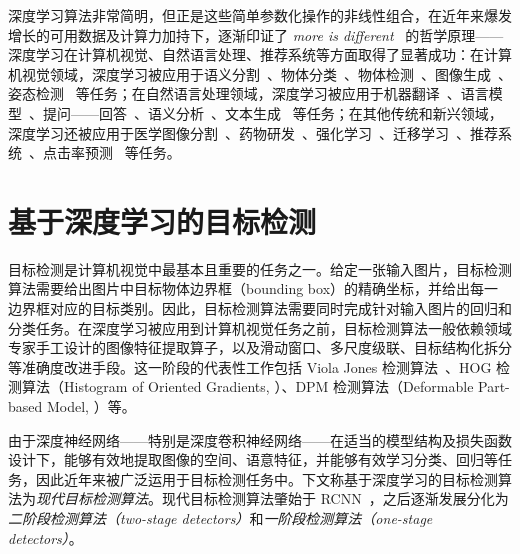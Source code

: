 \documentclass[
  fontset = mac,
]{shtthesis}
\begin{document}
深度学习算法非常简明，但正是这些简单参数化操作的非线性组合，在近年来爆发增长的可用数据及计算力加持下，逐渐印证了 \emph{more is different}~\citep{anderson1972more} 的哲学原理——深度学习在计算机视觉、自然语言处理、推荐系统等方面取得了显著成功：在计算机视觉领域，深度学习被应用于语义分割~\citep{yuan2019object}、物体分类~\citep{xie2019self}、物体检测~\citep{liu2019cbnet}、图像生成~\citep{song2019generative}、姿态检测~\citep{bulat2020toward} 等任务；在自然语言处理领域，深度学习被应用于机器翻译~\citep{edunov2018understanding}、语言模型~\citep{shoeybi2019megatron}、提问——回答~\citep{zhang2020retrospective}、语义分析~\citep{raffel2019exploring}、文本生成~\citep{guo2018long} 等任务；在其他传统和新兴领域，深度学习还被应用于医学图像分割~\citep{ronneberger2015u}、药物研发~\citep{alperstein2019all}、强化学习~\citep{mnih2015human}、迁移学习~\citep{wang2019easy}、推荐系统~\citep{rendle2019difficulty}、点击率预测~\citep{deng2020sparse} 等任务。
\section{基于深度学习的目标检测}
目标检测是计算机视觉中最基本且重要的任务之一。给定一张输入图片，目标检测算法需要给出图片中目标物体边界框（bounding box）的精确坐标，并给出每一边界框对应的目标类别。因此，目标检测算法需要同时完成针对输入图片的回归和分类任务。在深度学习被应用到计算机视觉任务之前，目标检测算法一般依赖领域专家手工设计的图像特征提取算子，以及滑动窗口、多尺度级联、目标结构化拆分等准确度改进手段。这一阶段的代表性工作包括 Viola Jones 检测算法~\citep{viola2001rapid, viola2004robust}、HOG 检测算法（Histogram of Oriented Gradients, \citet{dalal2005histograms}）、DPM 检测算法（Deformable Part-based Model, \citet{felzenszwalb2008discriminatively, felzenszwalb2009object, girshick2011object, girshick2012rigid}）等。

由于深度神经网络——特别是深度卷积神经网络——在适当的模型结构及损失函数设计下，能够有效地提取图像的空间、语意特征，并能够有效学习分类、回归等任务，因此近年来被广泛运用于目标检测任务中。下文称基于深度学习的目标检测算法为\emph{现代目标检测算法}。现代目标检测算法肇始于 RCNN~\citep{girshick2015region}，之后逐渐发展分化为\emph{二阶段检测算法（two-stage detectors）}和\emph{一阶段检测算法（one-stage detectors）}。
\end{document}

